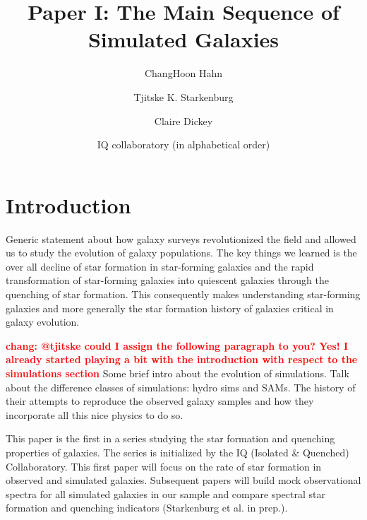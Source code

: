 \documentclass[preprint2,tighten]{aastex62}
\newcommand{\todo}[1]{{\bf \textcolor{red}{ #1}}}
\begin{document}
\title{Paper I: The Main Sequence of Simulated Galaxies}
\author{ChangHoon Hahn}
\author{Tjitske K. Starkenburg}
\author{Claire Dickey}

\author{IQ collaboratory (in alphabetical order)}

\begin{abstract}


\end{abstract}

\section{Introduction}
Generic statement about how galaxy surveys revolutionized the field and allowed
us to study the evolution of galaxy populations. The key things we learned is the
over all decline of star formation in star-forming galaxies and the rapid 
transformation of star-forming galaxies into quiescent galaxies through the 
quenching of star formation. This consequently makes understanding star-forming 
galaxies and more generally the star formation history of galaxies critical in 
galaxy evolution. 


\todo{chang: @tjitske could I assign the following paragraph to you? Yes! I already started playing a bit with the introduction with respect to the simulations section}
Some brief intro about the evolution of simulations. Talk about the difference 
classes of simulations: hydro sims and SAMs. The history of their attempts to 
reproduce the observed galaxy samples and how they incorporate all this nice 
physics to do so. 

This paper is the first in a series studying the star formation and quenching properties of galaxies. The series is initialized by the IQ (Isolated \& Quenched) Collaboratory. This first paper will focus on the rate of star formation in observed and simulated galaxies. Subsequent papers will build mock observational spectra for all simulated galaxies in our sample and compare spectral star formation and quenching indicators (Starkenburg et al. in prep.).
\end{document}
